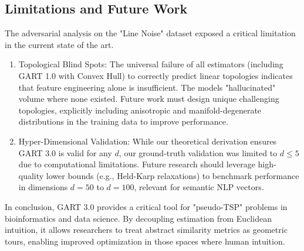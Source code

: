 \documentclass{article}
\begin{document}
\subsection{Limitations and Future Work}
The adversarial analysis on the "Line Noise" dataset exposed a critical limitation in the current state of the art.
\begin{enumerate}
    \item Topological Blind Spots: The universal failure of all estimators (including GART 1.0 with Convex Hull) to correctly predict linear topologies indicates that feature engineering alone is insufficient. The models "hallucinated" volume where none existed. Future work must design unique challenging topologies, explicitly including anisotropic and manifold-degenerate distributions in the training data to improve performance.
    \item Hyper-Dimensional Validation: While our theoretical derivation ensures GART 3.0 is valid for any $d$, our ground-truth validation was limited to $d \le 5$ due to computational limitations. Future research should leverage high-quality lower bounds (e.g., Held-Karp relaxations) to benchmark performance in dimensions $d=50$ to $d=100$, relevant for semantic NLP vectors.
\end{enumerate}

In conclusion, GART 3.0 provides a critical tool for "pseudo-TSP" problems in bioinformatics and data science. By decoupling estimation from Euclidean intuition, it allows researchers to treat abstract similarity metrics as geometric tours, enabling improved optimization in those spaces where human intuition.

\newpage
  
  
\end{document}
